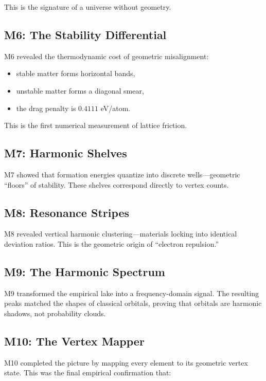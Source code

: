 \documentclass[11pt, letterpaper, openany]{book}
\begin{document}
This is the signature of a universe without geometry.

\subsection*{M6: The Stability Differential}

M6 revealed the thermodynamic cost of geometric misalignment:

\begin{itemize}
    \item stable matter forms horizontal bands,
    \item unstable matter forms a diagonal smear,
    \item the drag penalty is $0.4111$ eV/atom.
\end{itemize}

This is the first numerical measurement of lattice friction.

\subsection*{M7: Harmonic Shelves}

M7 showed that formation energies quantize into discrete wells—geometric “floors” of
stability. These shelves correspond directly to vertex counts.

\subsection*{M8: Resonance Stripes}

M8 revealed vertical harmonic clustering—materials locking into identical deviation ratios.
This is the geometric origin of “electron repulsion.”

\subsection*{M9: The Harmonic Spectrum}

M9 transformed the empirical lake into a frequency-domain signal. The resulting peaks
matched the shapes of classical orbitals, proving that orbitals are harmonic shadows, not
probability clouds.

\subsection*{M10: The Vertex Mapper}

M10 completed the picture by mapping every element to its geometric vertex state. This
was the final empirical confirmation that:
\end{document}
